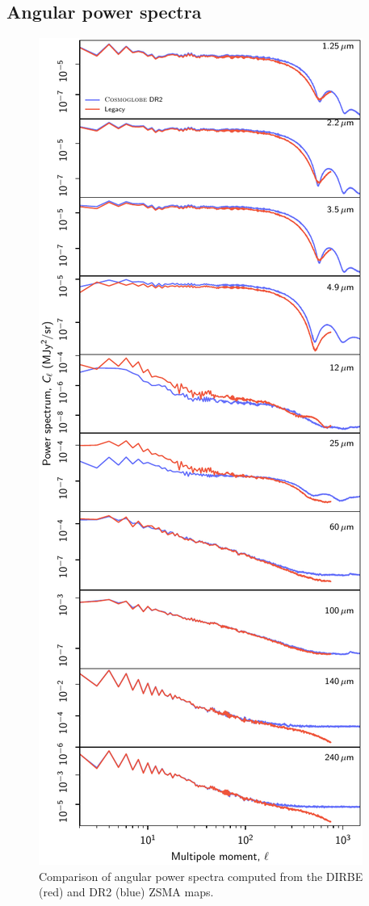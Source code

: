 \documentclass{aa}
\begin{document}
\subsection{Angular power spectra}

\begin{figure}
	\centering
	\includegraphics[width=\columnwidth]{figs/cls_DR2_vs_DIRBE_v1.pdf}
	\caption{Comparison of angular power spectra computed from the DIRBE (red) and DR2 (blue) ZSMA maps.}
	\label{fig:powspec}
\end{figure}
\end{document}
